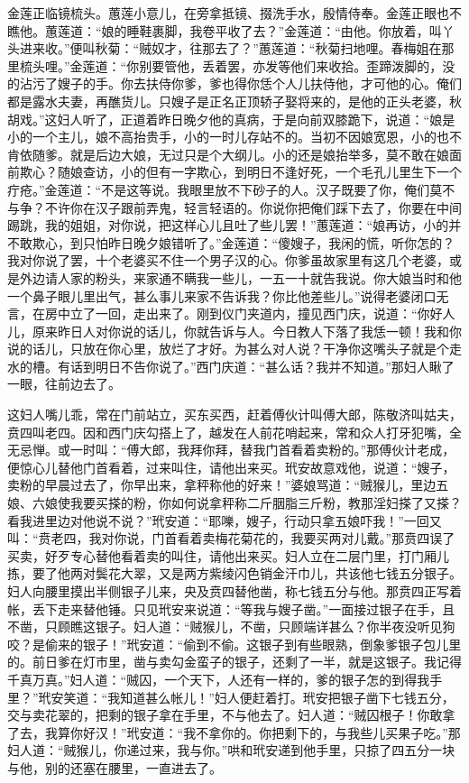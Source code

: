 金莲正临镜梳头。蕙莲小意儿，在旁拿抵镜、掇洗手水，殷情侍奉。金莲正眼也不瞧他。蕙莲道：“娘的睡鞋裹脚，我卷平收了去？”金莲道：“由他。你放着，叫丫头进来收。”便叫秋菊：“贼奴才，往那去了？”蕙莲道：“秋菊扫地哩。春梅姐在那里梳头哩。”金莲道：“你别要管他，丢着罢，亦发等他们来收拾。歪蹄泼脚的，没的沾污了嫂子的手。你去扶侍你爹，爹也得你恁个人儿扶侍他，才可他的心。俺们都是露水夫妻，再醮货儿。只嫂子是正名正顶轿子娶将来的，是他的正头老婆，秋胡戏。”这妇人听了，正道着昨日晚夕他的真病，于是向前双膝跪下，说道：“娘是小的一个主儿，娘不高抬贵手，小的一时儿存站不的。当初不因娘宽恩，小的也不肯依随爹。就是后边大娘，无过只是个大纲儿。小的还是娘抬举多，莫不敢在娘面前欺心？随娘查访，小的但有一字欺心，到明日不逢好死，一个毛孔儿里生下一个疔疮。”金莲道：“不是这等说。我眼里放不下砂子的人。汉子既要了你，俺们莫不与争？不许你在汉子跟前弄鬼，轻言轻语的。你说你把俺们踩下去了，你要在中间踢跳，我的姐姐，对你说，把这样心儿且吐了些儿罢！”蕙莲道：“娘再访，小的并不敢欺心，到只怕昨日晚夕娘错听了。”金莲道：“傻嫂子，我闲的慌，听你怎的？我对你说了罢，十个老婆买不住一个男子汉的心。你爹虽故家里有这几个老婆，或是外边请人家的粉头，来家通不瞒我一些儿，一五一十就告我说。你大娘当时和他一个鼻子眼儿里出气，甚么事儿来家不告诉我？你比他差些儿。”说得老婆闭口无言，在房中立了一回，走出来了。刚到仪门夹道内，撞见西门庆，说道：“你好人儿，原来昨日人对你说的话儿，你就告诉与人。今日教人下落了我恁一顿！我和你说的话儿，只放在你心里，放烂了才好。为甚么对人说？干净你这嘴头子就是个走水的槽。有话到明日不告你说了。”西门庆道：“甚么话？我并不知道。”那妇人瞅了一眼，往前边去了。

这妇人嘴儿乖，常在门前站立，买东买西，赶着傅伙计叫傅大郎，陈敬济叫姑夫，贲四叫老四。因和西门庆勾搭上了，越发在人前花哨起来，常和众人打牙犯嘴，全无忌惮。或一时叫：“傅大郎，我拜你拜，替我门首看着卖粉的。”那傅伙计老成，便惊心儿替他门首看着，过来叫住，请他出来买。玳安故意戏他，说道：“嫂子，卖粉的早晨过去了，你早出来，拿秤称他的好来！”婆娘骂道：“贼猴儿，里边五娘、六娘使我要买搽的粉，你如何说拿秤称二斤胭脂三斤粉，教那淫妇搽了又搽？看我进里边对他说不说？”玳安道：“耶嚛，嫂子，行动只拿五娘吓我！”一回又叫：“贲老四，我对你说，门首看着卖梅花菊花的，我要买两对儿戴。”那贲四误了买卖，好歹专心替他看着卖的叫住，请他出来买。妇人立在二层门里，打门厢儿拣，要了他两对鬓花大翠，又是两方紫绫闪色销金汗巾儿，共该他七钱五分银子。妇人向腰里摸出半侧银子儿来，央及贲四替他凿，称七钱五分与他。那贲四正写着帐，丢下走来替他锤。只见玳安来说道：“等我与嫂子凿。”一面接过银子在手，且不凿，只顾瞧这银子。妇人道：“贼猴儿，不凿，只顾端详甚么？你半夜没听见狗咬？是偷来的银子！”玳安道：“偷到不偷。这银子到有些眼熟，倒象爹银子包儿里的。前日爹在灯市里，凿与卖勾金蛮子的银子，还剩了一半，就是这银子。我记得千真万真。”妇人道：“贼囚，一个天下，人还有一样的，爹的银子怎的到得我手里？”玳安笑道：“我知道甚么帐儿！”妇人便赶着打。玳安把银子凿下七钱五分，交与卖花翠的，把剩的银子拿在手里，不与他去了。妇人道：“贼囚根子！你敢拿了去，我算你好汉！”玳安道：“我不拿你的。你把剩下的，与我些儿买果子吃。”那妇人道：“贼猴儿，你递过来，我与你。”哄和玳安递到他手里，只掠了四五分一块与他，别的还塞在腰里，一直进去了。

